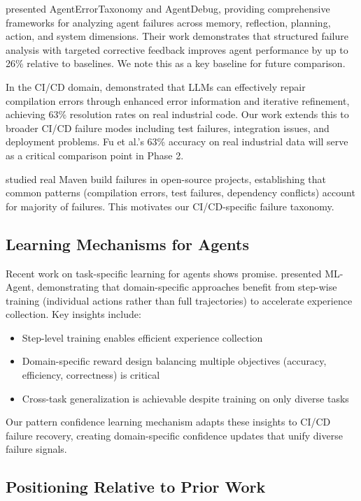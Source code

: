 \documentclass[11pt]{article}
\begin{document}
\citet{Zhu2025} presented AgentErrorTaxonomy and AgentDebug, providing comprehensive frameworks for analyzing agent failures across memory, reflection, planning, action, and system dimensions. Their work demonstrates that structured failure analysis with targeted corrective feedback improves agent performance by up to 26\% relative to baselines. We note this as a key baseline for future comparison.

In the CI/CD domain, \citet{Fu2025} demonstrated that LLMs can effectively repair compilation errors through enhanced error information and iterative refinement, achieving 63\% resolution rates on real industrial code. Our work extends this to broader CI/CD failure modes including test failures, integration issues, and deployment problems. Fu et al.'s 63\% accuracy on real industrial data will serve as a critical comparison point in Phase 2.

\citet{Vasallo2019} studied real Maven build failures in open-source projects, establishing that common patterns (compilation errors, test failures, dependency conflicts) account for majority of failures. This motivates our CI/CD-specific failure taxonomy.

\subsection{Learning Mechanisms for Agents}

Recent work on task-specific learning for agents shows promise. \citet{Liu2025} presented ML-Agent, demonstrating that domain-specific approaches benefit from step-wise training (individual actions rather than full trajectories) to accelerate experience collection. Key insights include:

\begin{itemize}
    \item Step-level training enables efficient experience collection
    \item Domain-specific reward design balancing multiple objectives (accuracy, efficiency, correctness) is critical
    \item Cross-task generalization is achievable despite training on only diverse tasks
\end{itemize}

Our pattern confidence learning mechanism adapts these insights to CI/CD failure recovery, creating domain-specific confidence updates that unify diverse failure signals.

\subsection{Positioning Relative to Prior Work}
\end{document}
